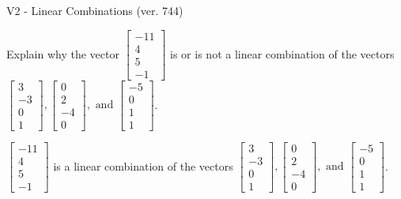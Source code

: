 \begin{exercise}
  \begin{exerciseTitle}V2 - Linear Combinations (ver. 744)\end{exerciseTitle}
  \begin{exerciseStatement}
    Explain why the vector \(\left[\begin{array}{c}
-11 \\
4 \\
5 \\
-1
\end{array}\right]\)  is or is not a linear 
	combination of the vectors \(\left[\begin{array}{c}
3 \\
-3 \\
0 \\
1
\end{array}\right] , \left[\begin{array}{c}
0 \\
2 \\
-4 \\
0
\end{array}\right] , \text{ and } \left[\begin{array}{c}
-5 \\
0 \\
1 \\
1
\end{array}\right]\).
	


  \end{exerciseStatement}
  \begin{exerciseAnswer}
   \(\left[\begin{array}{c}
-11 \\
4 \\
5 \\
-1
\end{array}\right]\) 
  	 is  
	a linear combination of the vectors \(\left[\begin{array}{c}
3 \\
-3 \\
0 \\
1
\end{array}\right] , \left[\begin{array}{c}
0 \\
2 \\
-4 \\
0
\end{array}\right] , \text{ and } \left[\begin{array}{c}
-5 \\
0 \\
1 \\
1
\end{array}\right]\).

	
  


  \end{exerciseAnswer}
\end{exercise}
